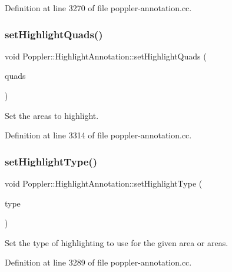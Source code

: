 Definition at line 3270 of file poppler-\/annotation.\+cc.

\mbox{\label{class_poppler_1_1_highlight_annotation_a2629917c423793c5eb96ec5eb9a563b0}} 
\subsubsection{\texorpdfstring{set\+Highlight\+Quads()}{setHighlightQuads()}}
{\footnotesize\ttfamily void Poppler\+::\+Highlight\+Annotation\+::set\+Highlight\+Quads (\begin{DoxyParamCaption}\item[{const Q\+List$<$ \hyperlink{struct_poppler_1_1_highlight_annotation_1_1_quad}{Quad} $>$ \&}]{quads }\end{DoxyParamCaption})}

Set the areas to highlight. 

Definition at line 3314 of file poppler-\/annotation.\+cc.

\mbox{\label{class_poppler_1_1_highlight_annotation_a7be625cca117ef75aeb1b1f569d575d7}} 
\subsubsection{\texorpdfstring{set\+Highlight\+Type()}{setHighlightType()}}
{\footnotesize\ttfamily void Poppler\+::\+Highlight\+Annotation\+::set\+Highlight\+Type (\begin{DoxyParamCaption}\item[{\hyperlink{class_poppler_1_1_highlight_annotation_ae605e74038eb2a3810a789377524f2a0}{Highlight\+Annotation\+::\+Highlight\+Type}}]{type }\end{DoxyParamCaption})}

Set the type of highlighting to use for the given area or areas. 

Definition at line 3289 of file poppler-\/annotation.\+cc.


